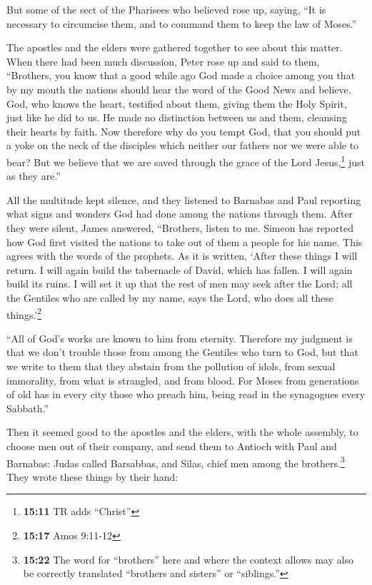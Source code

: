  But some of the sect of the Pharisees who believed rose
up, saying, ``It is necessary to circumcise them, and to command them to
keep the law of Moses.''

 The apostles and the elders were gathered together to see
about this matter.  When there had been much discussion,
Peter rose up and said to them, ``Brothers, you know that a good while
ago God made a choice among you that by my mouth the nations should hear
the word of the Good News and believe.  God, who knows the
heart, testified about them, giving them the Holy Spirit, just like he
did to us.  He made no distinction between us and them,
cleansing their hearts by faith.  Now therefore why do
you tempt God, that you should put a yoke on the neck of the disciples
which neither our fathers nor we were able to bear?  But
we believe that we are saved through the grace of the Lord
Jesus,\footnote{\textbf{15:11} TR adds ``Christ''} just as they are.''

 All the multitude kept silence, and they listened to
Barnabas and Paul reporting what signs and wonders God had done among
the nations through them.  After they were silent, James
answered, ``Brothers, listen to me.  Simeon has reported
how God first visited the nations to take out of them a people for his
name.  This agrees with the words of the prophets. As it
is written,  `After these things I will return. I will
again build the tabernacle of David, which has fallen. I will again
build its ruins. I will set it up  that the rest of men
may seek after the Lord; all the Gentiles who are called by my name,
says the Lord, who does all these things.'\footnote{\textbf{15:17} Amos
  9:11-12}

 ``All of God's works are known to him from eternity.
 Therefore my judgment is that we don't trouble those
from among the Gentiles who turn to God,  but that we
write to them that they abstain from the pollution of idols, from sexual
immorality, from what is strangled, and from blood.  For
Moses from generations of old has in every city those who preach him,
being read in the synagogues every Sabbath.''

 Then it seemed good to the apostles and the elders, with
the whole assembly, to choose men out of their company, and send them to
Antioch with Paul and Barnabas: Judas called Barsabbas, and Silas, chief
men among the brothers.\footnote{\textbf{15:22} The word for
  ``brothers'' here and where the context allows may also be correctly
  translated ``brothers and sisters'' or ``siblings.''} 
They wrote these things by their hand:

